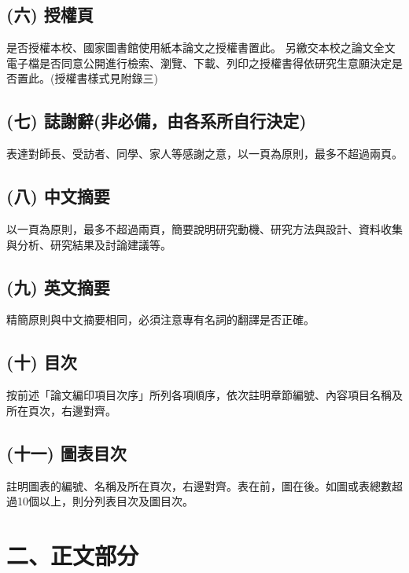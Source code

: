 \subsection{(六) 授權頁}
是否授權本校、國家圖書館使用紙本論文之授權書置此。
另繳交本校之論文全文電子檔是否同意公開進行檢索、瀏覽、下載、列印之授權書得依研究生意願決定是否置此。(授權書樣式見附錄三)

\subsection{(七) 誌謝辭(非必備，由各系所自行決定)}
表達對師長、受訪者、同學、家人等感謝之意，以一頁為原則，最多不超過兩頁。

\subsection{(八) 中文摘要}
以一頁為原則，最多不超過兩頁，簡要說明研究動機、研究方法與設計、資料收集與分析、研究結果及討論建議等。

\subsection{(九) 英文摘要}
精簡原則與中文摘要相同，必須注意專有名詞的翻譯是否正確。

\subsection{(十) 目次}
按前述「論文編印項目次序」所列各項順序，依次註明章節編號、內容項目名稱及所在頁次，右邊對齊。

\subsection{(十一) 圖表目次}
註明圖表的編號、名稱及所在頁次，右邊對齊。表在前，圖在後。如圖或表總數超過10個以上，則分列表目次及圖目次。

\section{二、正文部分}
